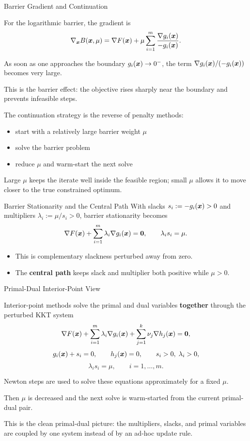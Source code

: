 \documentclass[11pt,compress,t,notes=noshow, xcolor=table]{beamer}
\begin{document}
\begin{framei}[fs=small]{Barrier Gradient and Continuation}
\item For the logarithmic barrier, the gradient is
$$
\nabla_{\bm{x}} B(\bm{x},\mu)
=
\nabla F(\bm{x})
+
\mu \sum_{i=1}^m \frac{\nabla g_i(\bm{x})}{-g_i(\bm{x})}.
$$
\item As soon as one approaches the boundary $g_i(\bm{x}) \to 0^-$, the term $\nabla g_i(\bm{x}) / (-g_i(\bm{x}))$ becomes very large.
\item This is the barrier effect: the objective rises sharply near the boundary and prevents infeasible steps.
\item The continuation strategy is the reverse of penalty methods:
\begin{itemize}
\item start with a relatively large barrier weight $\mu$
\item solve the barrier problem
\item reduce $\mu$ and warm-start the next solve
\end{itemize}
\item Large $\mu$ keeps the iterate well inside the feasible region; small $\mu$ allows it to move closer to the true constrained optimum.
\end{framei}


\begin{framev}[fs=scriptsize]{Barrier Stationarity and the Central Path}
With slacks $s_i := -g_i(\bm{x}) > 0$ and multipliers $\lambda_i := \mu / s_i > 0$,
barrier stationarity becomes
$$
\nabla F(\bm{x}) + \sum_{i=1}^m \lambda_i \nabla g_i(\bm{x}) = \mathbf{0},
\qquad
\lambda_i s_i = \mu.
$$
\begin{itemize}
\item This is complementary slackness perturbed away from zero.
\item The \textbf{central path} keeps slack and multiplier both positive while $\mu > 0$.
\end{itemize}
\end{framev}


\begin{framei}[fs=footnotesize]{Primal-Dual Interior-Point View}
\item Interior-point methods solve the primal and dual variables \textbf{together} through the perturbed KKT system
$$
\nabla F(\bm{x})
+
\sum_{i=1}^m \lambda_i \nabla g_i(\bm{x})
+
\sum_{j=1}^k \nu_j \nabla h_j(\bm{x})
=
\mathbf{0},
$$
$$
g_i(\bm{x}) + s_i = 0,
\qquad
h_j(\bm{x})=0,
\qquad
s_i > 0,\;
\lambda_i > 0,
$$
$$
\lambda_i s_i = \mu,
\qquad i=1,\dots,m.
$$
\item Newton steps are used to solve these equations approximately for a fixed $\mu$.
\item Then $\mu$ is decreased and the next solve is warm-started from the current primal-dual pair.
\item This is the clean primal-dual picture: the multipliers, slacks, and primal variables are coupled by one system instead of by an ad-hoc update rule.
\end{framei}
\end{document}
